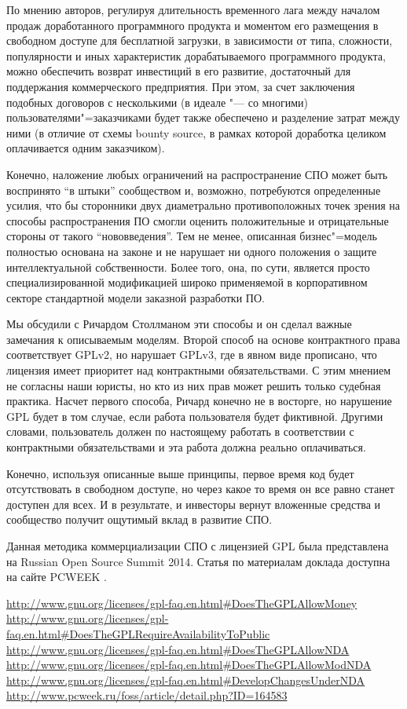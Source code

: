 \documentclass[10pt, a5paper]{article}
\begin{document}
По мнению авторов, регулируя длительность временного лага между началом продаж доработанного программного продукта и моментом его размещения в свободном доступе для бесплатной загрузки, в зависимости от типа, сложности, популярности и иных характеристик дорабатываемого программного продукта, можно обеспечить возврат инвестиций в его развитие, достаточный для поддержания коммерческого предприятия. При этом, за счет заключения подобных договоров с несколькими (в идеале "--- со многими) пользователями"=заказчиками будет также обеспечено и разделение затрат между ними (в отличие от схемы bounty source, в рамках которой доработка целиком оплачивается одним заказчиком).

Конечно, наложение любых ограничений на распространение СПО может быть воспринято “в штыки” сообществом и, возможно, потребуются определенные усилия, что бы сторонники двух диаметрально противоположных точек зрения на способы распространения ПО смогли оценить положительные и отрицательные стороны от такого “нововведения”. Тем не менее, описанная бизнес"=модель полностью основана на законе и не нарушает ни одного положения о защите интеллектуальной собственности. Более того, она, по сути, является просто специализированной модификацией широко применяемой в корпоративном секторе стандартной модели заказной разработки ПО.

Мы обсудили с Ричардом Столлманом эти способы и он сделал важные замечания к описываемым моделям. Второй способ на основе контрактного права соответствует GPLv2, но нарушает GPLv3, где в явном виде прописано, что лицензия имеет приоритет над контрактными обязательствами. С этим мнением не согласны наши юристы, но кто из них прав может решить только судебная практика.
Насчет первого способа, Ричард конечно не в восторге, но нарушение GPL будет в том случае, если работа пользователя будет фиктивной. Другими словами, пользователь должен по настоящему работать в соответствии с контрактными обязательствами и эта работа должна реально оплачиваться.

Конечно, используя описанные выше принципы, первое время код будет отсутствовать в свободном доступе, но через какое то время он все равно станет доступен для всех. И в результате, и инвесторы вернут вложенные средства и сообщество получит ощутимый вклад в развитие СПО.

Данная методика коммерциализации СПО с лицензией GPL была представлена на Russian Open Source Summit 2014. Статья по материалам доклада доступна на сайте PCWEEK \cite{ryabikov6}.

\begin{thebibliography}{9}
 \url{http://www.gnu.org/licenses/gpl-faq.en.html#DoesTheGPLAllowMoney}
 \url{http://www.gnu.org/licenses/gpl-faq.en.html#DoesTheGPLRequireAvailabilityToPublic}
 \url{http://www.gnu.org/licenses/gpl-faq.en.html#DoesTheGPLAllowNDA}
 \url{http://www.gnu.org/licenses/gpl-faq.en.html#DoesTheGPLAllowModNDA}
 \url{http://www.gnu.org/licenses/gpl-faq.en.html#DevelopChangesUnderNDA}
 \url{http://www.pcweek.ru/foss/article/detail.php?ID=164583}
\end{thebibliography}
\end{document}
